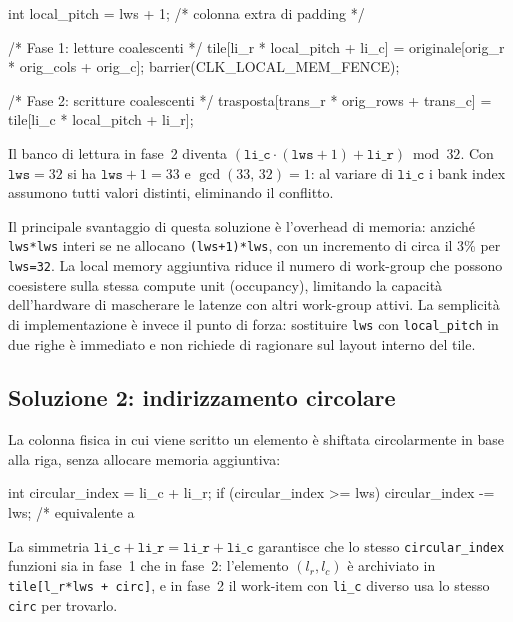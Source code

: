 \begin{code}[caption={Accesso al tile con padding}, label={code:tile_padding_kernel}]
int local_pitch = lws + 1;   /* colonna extra di padding */

/* Fase 1: letture coalescenti */
tile[li_r * local_pitch + li_c] = originale[orig_r * orig_cols + orig_c];
barrier(CLK_LOCAL_MEM_FENCE);

/* Fase 2: scritture coalescenti */
trasposta[trans_r * orig_rows + trans_c] = tile[li_c * local_pitch + li_r];
\end{code}

Il banco di lettura in fase~2 diventa $(\texttt{li\_c}\cdot(\texttt{lws}+1)+\texttt{li\_r})\bmod 32$. Con $\texttt{lws}=32$ si ha $\texttt{lws}+1=33$ e $\gcd(33,\,32)=1$: al variare di $\texttt{li\_c}$ i bank index assumono tutti valori distinti, eliminando il conflitto.

Il principale svantaggio di questa soluzione è l'overhead di memoria: anziché \texttt{lws*lws} interi se ne allocano \texttt{(lws+1)*lws}, con un incremento di circa il 3\% per \texttt{lws=32}. La local memory aggiuntiva riduce il numero di work-group che possono coesistere sulla stessa compute unit (occupancy), limitando la capacità dell'hardware di mascherare le latenze con altri work-group attivi. La semplicità di implementazione è invece il punto di forza: sostituire \texttt{lws} con \texttt{local\_pitch} in due righe è immediato e non richiede di ragionare sul layout interno del tile.

\subsection{Soluzione 2: indirizzamento circolare}\label{sec:opencl_lmem_circular}

La colonna fisica in cui viene scritto un elemento è shiftata circolarmente in base alla riga, senza allocare memoria aggiuntiva:

\begin{code}[caption={Calcolo dell'indice circolare}, label={code:circular_index}]
int circular_index = li_c + li_r;
if (circular_index >= lws) circular_index -= lws; /* equivalente a %
\end{code}

La simmetria $\texttt{li\_c}+\texttt{li\_r}=\texttt{li\_r}+\texttt{li\_c}$ garantisce che lo stesso \texttt{circular\_index} funzioni sia in fase~1 che in fase~2: l'elemento $(l_r,l_c)$ è archiviato in \texttt{tile[l\_r*lws\,+\,circ]}, e in fase~2 il work-item con \texttt{li\_c} diverso usa lo stesso \texttt{circ} per trovarlo.

